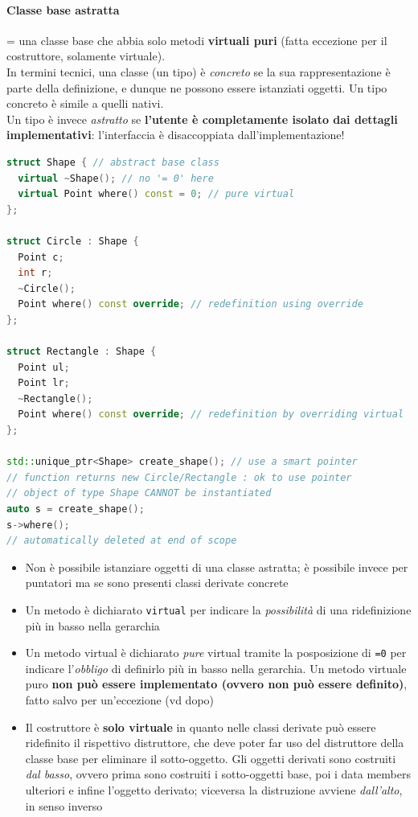 \documentclass[10pt, oneside]{book}
\begin{document}
\paragraph{Classe base astratta} = una classe base che abbia solo metodi \textbf{virtuali puri} (fatta eccezione per il costruttore, solamente virtuale).\\
In termini tecnici, una classe (un tipo) è \textit{concreto} se la sua rappresentazione è parte della definizione, e dunque ne possono essere istanziati oggetti. Un tipo concreto è simile a quelli nativi.\\
Un tipo è invece \textit{astratto} se \textbf{l'utente è completamente isolato dai dettagli implementativi}: l'interfaccia è disaccoppiata dall'implementazione!
\begin{lstlisting}[language=C++]
struct Shape { // abstract base class
  virtual ~Shape(); // no '= 0' here
  virtual Point where() const = 0; // pure virtual
};

struct Circle : Shape {
  Point c;
  int r;
  ~Circle();
  Point where() const override; // redefinition using override
};

struct Rectangle : Shape {
  Point ul;
  Point lr;
  ~Rectangle();
  Point where() const override; // redefinition by overriding virtual
};

std::unique_ptr<Shape> create_shape(); // use a smart pointer
// function returns new Circle/Rectangle : ok to use pointer
// object of type Shape CANNOT be instantiated
auto s = create_shape();
s->where();
// automatically deleted at end of scope
\end{lstlisting}
\begin{itemize}
\item Non è possibile istanziare oggetti di una classe astratta; è possibile invece per puntatori ma se sono presenti classi derivate concrete
\item Un metodo è dichiarato \texttt{virtual} per indicare la \textit{possibilità} di una ridefinizione più in basso nella gerarchia
\item Un metodo virtual è dichiarato \textit{pure} virtual tramite la posposizione di \texttt{=0} per indicare l'\textit{obbligo} di definirlo più in basso nella gerarchia. Un metodo virtuale puro \textbf{non può essere implementato (ovvero non può essere definito)}, fatto salvo per un'eccezione (vd dopo)
\item Il costruttore è \textbf{solo virtuale} in quanto nelle classi derivate può essere ridefinito il rispettivo distruttore, che deve poter far uso del distruttore della classe base per eliminare il sotto-oggetto. Gli oggetti derivati sono costruiti \textit{dal basso}, ovvero prima sono costruiti i sotto-oggetti base, poi i data members ulteriori e infine l'oggetto derivato; viceversa la distruzione avviene \textit{dall'alto}, in senso inverso
\end{itemize}
\end{document}
